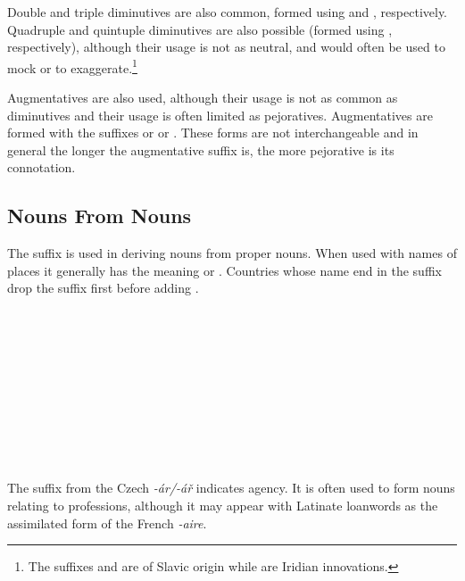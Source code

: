 Double and triple diminutives are also common, formed using  and , respectively. Quadruple and quintuple diminutives are also possible (formed using  , respectively), although their usage is not as neutral, and would often be used to mock or to exaggerate.\footnote{The suffixes  and  are of Slavic origin while   are Iridian innovations.}

Augmentatives are also used, although their usage is not as common as diminutives and their usage is often limited as pejoratives. Augmentatives are formed with the suffixes  or  or . These forms are not interchangeable and in general the longer the augmentative suffix is, the more pejorative is its connotation.

\subsection{Nouns From Nouns}

The suffix  is used in deriving nouns from proper nouns. When used with names of places it generally has the meaning  or . Countries whose name end in the suffix  drop the suffix first before adding .

\begin{multicols}{2}
  \ex
  \\
  \\
  \\
  \\
  \\
  \\
  \\
  \\
  \\
  \xe
\end{multicols}


The suffix  from the Czech \emph{-\'ar/-\'a\v{r}} indicates agency. It is often used to form nouns relating to professions, although it may appear with Latinate loanwords as the assimilated form of the French \emph{-aire}.

